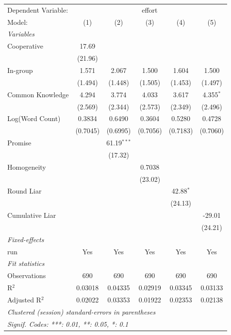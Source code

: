 
\begingroup
\centering
\begin{tabular}{lccccc}
   \tabularnewline \midrule \midrule
   Dependent Variable: & \multicolumn{5}{c}{effort}\\
   Model:           & (1)      & (2)           & (3)      & (4)         & (5)\\  
   \midrule
   \emph{Variables}\\
   Cooperative      & 17.69    &               &          &             &   \\   
                    & (21.96)  &               &          &             &   \\   
   In-group         & 1.571    & 2.067         & 1.500    & 1.604       & 1.500\\   
                    & (1.494)  & (1.448)       & (1.505)  & (1.453)     & (1.497)\\   
   Common Knowledge & 4.294    & 3.774         & 4.033    & 3.617       & 4.355$^{*}$\\   
                    & (2.569)  & (2.344)       & (2.573)  & (2.349)     & (2.496)\\   
   Log(Word Count)  & 0.3834   & 0.6490        & 0.3604   & 0.5280      & 0.4728\\   
                    & (0.7045) & (0.6995)      & (0.7056) & (0.7183)    & (0.7060)\\   
   Promise          &          & 61.19$^{***}$ &          &             &   \\   
                    &          & (17.32)       &          &             &   \\   
   Homogeneity      &          &               & 0.7038   &             &   \\   
                    &          &               & (23.02)  &             &   \\   
   Round Liar       &          &               &          & 42.88$^{*}$ &   \\   
                    &          &               &          & (24.13)     &   \\   
   Cumulative Liar  &          &               &          &             & -29.01\\   
                    &          &               &          &             & (24.21)\\   
   \midrule
   \emph{Fixed-effects}\\
   run              & Yes      & Yes           & Yes      & Yes         & Yes\\  
   \midrule
   \emph{Fit statistics}\\
   Observations     & 690      & 690           & 690      & 690         & 690\\  
   R$^2$            & 0.03018  & 0.04335       & 0.02919  & 0.03345     & 0.03133\\  
   Adjusted R$^2$   & 0.02022  & 0.03353       & 0.01922  & 0.02353     & 0.02138\\  
   \midrule \midrule
   \multicolumn{6}{l}{\emph{Clustered (session) standard-errors in parentheses}}\\
   \multicolumn{6}{l}{\emph{Signif. Codes: ***: 0.01, **: 0.05, *: 0.1}}\\
\end{tabular}
\par\endgroup


